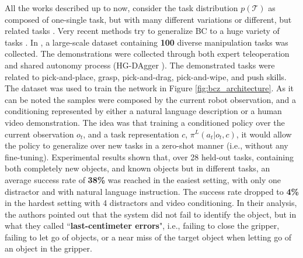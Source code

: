 All the works described up to now, consider the task distribution $p(\mathcal{T})$ as composed of one-single task, but with many different variations \cite{finn2017one_shot_visual_il} or different, but related tasks \cite{yu2018daml}. Very recent methods try to generalize BC to a huge variety of tasks \cite{jang2022bc_z,mandi2022towards_more_generalizable_one_shot}.
In \cite{jang2022bc_z}, a large-scale dataset containing \textbf{100} diverse manipulation tasks was collected. The demonstrations were collected through both expert teleoperation and shared autonomy process (HG-DAgger \cite{kelly2019hg_dagger}). The demonstrated tasks were related to pick-and-place, grasp, pick-and-drag, pick-and-wipe, and push skills. The dataset was used to train the network in Figure \ref{fig:bcz_architecture}. As it can be noted the samples were composed by the current robot observation, and a conditioning represented by either a natural language description or a human video demonstration. The idea was that training a conditioned policy over the current observation $o_{t}$, and a task representation $c$, $\pi^{L}(a_{t}|o_{t}, c)$, it would allow the policy to generalize over new tasks in a zero-shot manner (i.e., without any fine-tuning). Experimental results shown that, over 28 held-out tasks, containing both completely new objects, and known objects but in different tasks, an average success rate of \textbf{38\%} was reached in the easiest setting, with only one distractor and with natural language instruction. The success rate dropped to \textbf{4\%} in the hardest setting with 4 distractors and video conditioning. %
In their analysis, the authors pointed out that the system did not fail to identify the object, but in what they called ``\textbf{last-centimeter errors}", i.e., failing to close the gripper, failing to let go of objects, or a near miss of the target object when letting go of an object in the gripper. 
